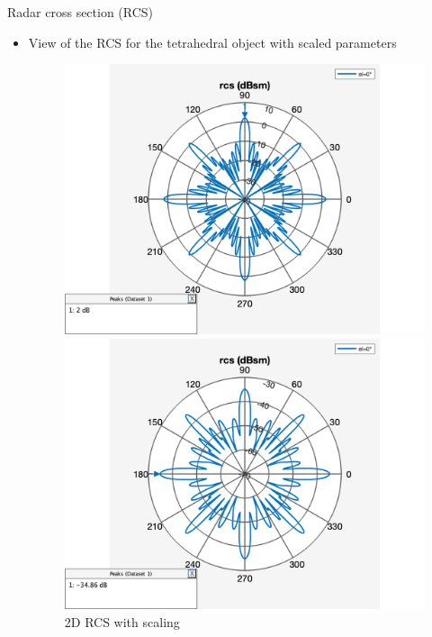 \documentclass{beamer}
\newcounter{section}
\begin{document}
\begin{frame}[t]{Radar cross section (RCS)}
	\begin{itemize}
	    \item View of the RCS for the tetrahedral object with scaled parameters
        \vspace{0.5\baselineskip}
            \begin{figure}
                \centering
                \begin{minipage}{0.47\textwidth}
                    \centering
                    \includegraphics[height=0.7\textwidth]{figures/rcs_tetrahedral.png}
                    \caption{2D RCS without scaling}
                \end{minipage}
                \begin{minipage}{0.47\textwidth}
                    \centering
                    \includegraphics[height=0.7\textwidth]{figures/rcs_tetrahedral_scaled.png}
                    \caption{2D RCS with scaling}
                \end{minipage}
            \end{figure}
	\end{itemize}
\end{frame}
\end{document}
